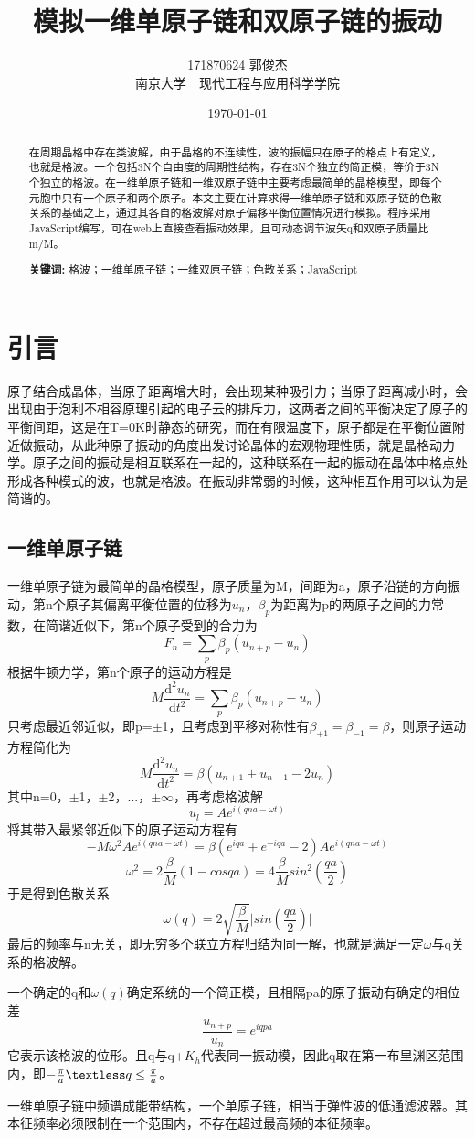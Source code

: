 \documentclass[UTF8]{article}
\title{模拟一维单原子链和双原子链的振动}   %
\author{171870624 郭俊杰\\南京大学$\quad$现代工程与应用科学学院}   %
\date{\today}    %
\begin{document}
\maketitle

\begin{abstract}
在周期晶格中存在类波解，由于晶格的不连续性，波的振幅只在原子的格点上有定义，也就是格波。一个包括3N个自由度的周期性结构，存在3N个独立的简正模，等价于3N个独立的格波。在一维单原子链和一维双原子链中主要考虑最简单的晶格模型，即每个元胞中只有一个原子和两个原子。本文主要在计算求得一维单原子链和双原子链的色散关系的基础之上，通过其各自的格波解对原子偏移平衡位置情况进行模拟。程序采用JavaScript编写，可在web上直接查看振动效果，且可动态调节波矢q和双原子质量比m/M。 \\
\par\textbf{关键词: } 格波；一维单原子链；一维双原子链；色散关系；JavaScript
\end{abstract}


\section{引言}
原子结合成晶体，当原子距离增大时，会出现某种吸引力；当原子距离减小时，会出现由于泡利不相容原理引起的电子云的排斥力，这两者之间的平衡决定了原子的平衡间距，这是在T=0K时静态的研究，而在有限温度下，原子都是在平衡位置附近做振动，从此种原子振动的角度出发讨论晶体的宏观物理性质，就是晶格动力学。原子之间的振动是相互联系在一起的，这种联系在一起的振动在晶体中格点处形成各种模式的波，也就是格波。在振动非常弱的时候，这种相互作用可以认为是简谐的。

\subsection{一维单原子链}
一维单原子链为最简单的晶格模型，原子质量为M，间距为a，原子沿链的方向振动，第n个原子其偏离平衡位置的位移为$u_n$，$\beta_p$为距离为p的两原子之间的力常数，在简谐近似下，第n个原子受到的合力为$$F_n = \sum_p\beta_p(u_{n+p}-u_n)$$根据牛顿力学，第n个原子的运动方程是$$M\frac{\mathrm{d}^2u_n}{\mathrm{d}t^2}=\sum_p\beta_p(u_{n+p}-u_n)$$只考虑最近邻近似，即p=$\pm$1，且考虑到平移对称性有$\beta_{+1}=\beta_{-1}=\beta$，则原子运动方程简化为$$M\frac{\mathrm{d}^2u_n}{\mathrm{d}t^2}=\beta(u_{n+1}+u_{n-1}-2u_{n})$$其中n=0，$\pm$1，$\pm$2，...，$\pm\infty$，再考虑格波解$$u_l=Ae^{i(qna-\omega t)}$$将其带入最紧邻近似下的原子运动方程有$$-M\omega^2Ae^{i(qna-\omega t)}=\beta(e^{iqa}+e^{-iqa}-2)Ae^{i(qna-\omega t)}$$ $$\omega^2=2\frac{\beta}{M}(1-cosqa)=4\frac{\beta}{M}sin^2(\frac{qa}{2})$$于是得到色散关系$$\omega(q)=2\sqrt{\frac{\beta}{M}}\vert{sin(\frac{qa}{2})}\vert$$最后的频率与n无关，即无穷多个联立方程归结为同一解，也就是满足一定$\omega$与q关系的格波解。
\par
一个确定的q和$\omega(q)$确定系统的一个简正模，且相隔pa的原子振动有确定的相位差$$\frac{u_{n+p}}{u_n}=e^{iqpa}$$它表示该格波的位形。且q与q+$K_h$代表同一振动模，因此q取在第一布里渊区范围内，即$-\frac{\pi}{a} \textless q\leq\frac{\pi}{a}$。
\par
一维单原子链中频谱成能带结构，一个单原子链，相当于弹性波的低通滤波器。其本征频率必须限制在一个范围内，不存在超过最高频的本征频率。
\end{document}
